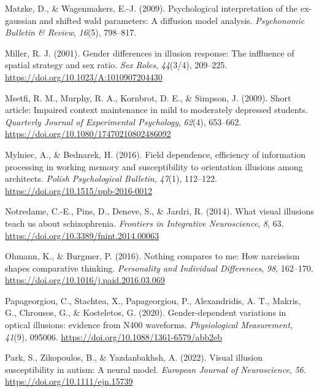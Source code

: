 \documentclass[
  man,floatsintext]{apa6}
\newlength{\cslhangindent}
\newlength{\cslentryspacingunit} %
\newenvironment{CSLReferences}[2] %
 {%
  \setlength{\parindent}{0pt}
  \ifodd #1
  \let\oldpar\par
  \def\par{\hangindent=\cslhangindent\oldpar}
  \fi
  \setlength{\parskip}{#2\cslentryspacingunit}
 }%
 {}
\begin{document}
\begin{CSLReferences}{1}{0}
\leavevmode{}%
Matzke, D., \& Wagenmakers, E.-J. (2009). Psychological interpretation of the ex-gaussian and shifted wald parameters: A diffusion model analysis. \emph{Psychonomic Bulletin \& Review}, \emph{16}(5), 798--817.

\leavevmode{}%
Miller, R. J. (2001). Gender differences in illusion response: The inffluence of spatial strategy and sex ratio. \emph{Sex Roles}, \emph{44}(3/4), 209--225. \url{https://doi.org/10.1023/A:1010907204430}

\leavevmode{}%
Msetfi, R. M., Murphy, R. A., Kornbrot, D. E., \& Simpson, J. (2009). Short article: Impaired context maintenance in mild to moderately depressed students. \emph{Quarterly Journal of Experimental Psychology}, \emph{62}(4), 653--662. \url{https://doi.org/10.1080/17470210802486092}

\leavevmode{}%
Mylniec, A., \& Bednarek, H. (2016). Field dependence, efficiency of information processing in working memory and susceptibility to orientation illusions among architects. \emph{Polish Psychological Bulletin}, \emph{47}(1), 112--122. \url{https://doi.org/10.1515/ppb-2016-0012}

\leavevmode{}%
Notredame, C.-E., Pins, D., Deneve, S., \& Jardri, R. (2014). What visual illusions teach us about schizophrenia. \emph{Frontiers in Integrative Neuroscience}, \emph{8}, 63. \url{https://doi.org/10.3389/fnint.2014.00063}

\leavevmode{}%
Ohmann, K., \& Burgmer, P. (2016). Nothing compares to me: How narcissism shapes comparative thinking. \emph{Personality and Individual Differences}, \emph{98}, 162--170. \url{https://doi.org/10.1016/j.paid.2016.03.069}

\leavevmode{}%
Papageorgiou, C., Stachtea, X., Papageorgiou, P., Alexandridis, A. T., Makris, G., Chrousos, G., \& Kosteletos, G. (2020). Gender-dependent variations in optical illusions: evidence from N400 waveforms. \emph{Physiological Measurement}, \emph{41}(9), 095006. \url{https://doi.org/10.1088/1361-6579/abb2eb}

\leavevmode{}%
Park, S., Zikopoulos, B., \& Yazdanbakhsh, A. (2022). Visual illusion susceptibility in autism: A neural model. \emph{European Journal of Neuroscience}, \emph{56}. \url{https://doi.org/10.1111/ejn.15739}


\end{CSLReferences}
\end{document}

